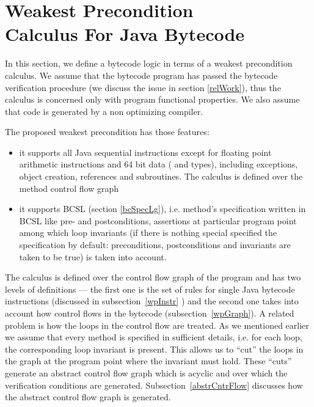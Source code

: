 
\section{Weakest Precondition \\Calculus For Java Bytecode}\label{wpbc}
In this section, we define a bytecode logic in terms of a weakest precondition calculus.
We assume that the bytecode program has passed the bytecode verification procedure (we discuss the issue in section \ref{relWork}),
 thus the calculus is concerned only with program functional properties. We also assume that code is generated by a non optimizing compiler. 

The proposed weakest precondition has those features:
\begin{itemize}
\item it supports all Java sequential instructions except for floating point arithmetic instructions and 64 bit data ( and  types), including 
exceptions, object creation, references and subroutines. The calculus is defined over the method control flow graph

\item it supports BCSL (section \ref{bcSpecLg}), i.e. method's specification written in BCSL like pre- and postconditions, assertions at particular program point among 
which loop invariants (if there is nothing special specified the specification by default: preconditions, postconditions and invariants are taken to be true) is taken into account. %
\end{itemize}

The calculus is defined over the control flow graph of the program and has two levels of definitions --- the first one is the set of rules for single Java bytecode instructions (discussed in subsection~\ref{wpInstr} ) and the second one takes into account how control
 flows in the bytecode (subsection~\ref{wpGraph}). A related problem is how the loops in the control flow are treated. 
As we mentioned earlier we assume that every method is specified in sufficient details, i.e. for each loop, the corresponding 
loop invariant is present. This allows us to ``cut'' the loops in the graph at the program point where the invariant must hold. 
These ``cuts'' generate an abstract control flow graph which is acyclic and over which the verification conditions are generated. Subsection~\ref{abstrCntrFlow} discusses 
how the abstract control flow graph is generated.

